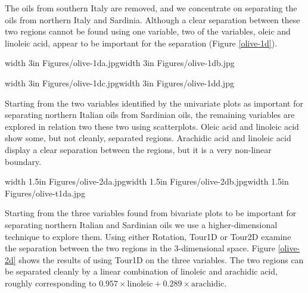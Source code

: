 \documentclass{article}
\begin{document}
The oils from southern Italy are removed, and we concentrate on
separating the oils from northern Italy and Sardinia. Although a clear
separation between these two regions cannot be found using one
variable, two of the variables, oleic and linoleic acid, appear to be
important for the separation (Figure \ref{olive-1d}).

\begin{figure*}[htbp]
\centerline{{\pdfimage width 3in {Figures/olive-1da.jpg}}{\pdfimage width 3in {Figures/olive-1db.jpg}}}
\centerline{{\pdfimage width 3in {Figures/olive-1dc.jpg}}{\pdfimage width 3in {Figures/olive-1dd.jpg}}}
\caption{Separation between the 3 regions of Italian olive oil data
in univariate plots.}
\label{olive-1d}
\end{figure*}


Starting from the two variables identified by the univariate plots as
important for separating northern Italian oils from Sardinian oils,
the remaining variables are explored in relation two these two using
scatterplots. Oleic acid and linoleic acid show some, but not cleanly,
separated regions. Arachidic acid and linoleic acid display a clear
separation between the regions, but it is a very non-linear boundary.

\begin{figure*}[htbp]
\centerline{{\pdfimage width 1.5in {Figures/olive-2da.jpg}}{\pdfimage width 1.5in {Figures/olive-2db.jpg}}{\pdfimage width 1.5in {Figures/olive-t1da.jpg}}}
\caption{Separation between the northern Italian and Sardinian oils in 
bivariate plots and multivariate plots.}
\label{olive-2d}
\end{figure*}


Starting from the three variables found from bivariate plots to be
important for separating northern Italian and Sardinian oils we use a
higher-dimensional technique to explore them. Using either Rotation,
Tour1D or Tour2D examine the separation between the two regions in the
3-dimensional space. Figure \ref{olive-2d} shows the results of using
Tour1D on the three variables. The two regions can be separated
cleanly by a linear combination of linoleic and arachidic acid,
roughly corresponding to $0.957\times \mbox{linoleic} + 0.289\times
\mbox{arachidic}$.

\end{document}
